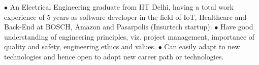 \documentclass[9pt]{developercv} %
\begin{document}
\vspace{0.5cm}



\begin{minipage}[t]{0.6\textwidth} %
	\vspace{-\baselineskip} %
	
	 $\bullet$ An Electrical Engineering graduate from IIT Delhi, having a total work experience of 5 years as software developer in the field of IoT, Healthcare and Back-End at BOSCH, Amazon and Pasarpolis (Insurtech startup). $\bullet$ Have good understanding of engineering principles, viz. project management, importance of quality and safety, engineering ethics and values. $\bullet$ Can easily adapt to new technologies and hence open to adopt new career path or technologies.\\ %
\end{minipage}
\hfill %
\begin{minipage}[t]{0.35\textwidth} %
	\vspace{-\baselineskip} %
	\begin{barchart}{4} %
	\end{barchart}
\end{minipage}



\end{document}

